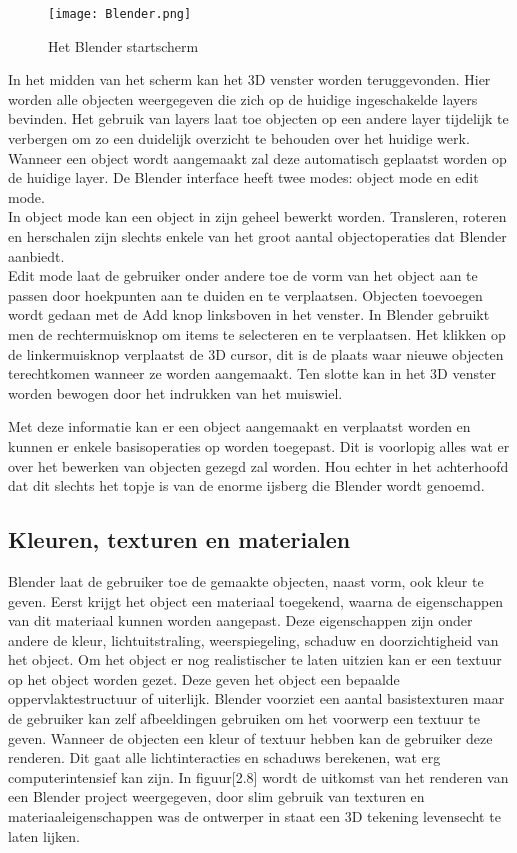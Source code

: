 \begin{figure}[h]
\texttt{[image: Blender.png]}
\caption{Het Blender startscherm}
\end{figure}

\par
In het midden van het scherm kan het 3D venster worden teruggevonden. Hier worden alle objecten weergegeven die zich op de huidige ingeschakelde layers bevinden. Het gebruik van layers laat toe objecten op een andere layer tijdelijk te verbergen om zo een duidelijk overzicht te behouden over het huidige werk. Wanneer een object wordt aangemaakt zal deze automatisch geplaatst worden op de huidige layer. De Blender interface heeft twee modes: object mode en edit mode.
\\
In object mode kan een object in zijn geheel bewerkt worden. Transleren, roteren en herschalen zijn slechts enkele van het groot aantal objectoperaties dat Blender aanbiedt. 
\\
Edit mode laat de gebruiker onder andere toe de vorm van het object aan te passen door hoekpunten aan te duiden en te verplaatsen. 
Objecten toevoegen wordt gedaan met de Add knop linksboven in het venster. 
In Blender gebruikt men de rechtermuisknop om items te selecteren en te verplaatsen. Het klikken op de linkermuisknop verplaatst de 3D cursor, dit is de plaats waar nieuwe objecten terechtkomen wanneer ze worden aangemaakt. Ten slotte kan in het 3D venster worden bewogen door het indrukken van het muiswiel.

\par
Met deze informatie kan er een object aangemaakt en verplaatst worden en kunnen er enkele basisoperaties op worden toegepast. Dit is voorlopig alles wat er over het bewerken van objecten gezegd zal worden. Hou echter in het achterhoofd dat dit slechts het topje is van de enorme ijsberg die Blender wordt genoemd.


\subsection{Kleuren, texturen en materialen}
Blender laat de gebruiker toe de gemaakte objecten, naast vorm, ook kleur te geven. Eerst krijgt het object een materiaal toegekend, waarna de eigenschappen van dit materiaal kunnen worden aangepast. Deze eigenschappen zijn onder andere de kleur, lichtuitstraling, weerspiegeling, schaduw en doorzichtigheid van het object. Om het object er nog realistischer te laten uitzien kan er een textuur op het object worden gezet. Deze geven het object een bepaalde oppervlaktestructuur of uiterlijk. Blender voorziet een aantal basistexturen maar de gebruiker kan zelf afbeeldingen gebruiken om het voorwerp een textuur te geven. Wanneer de objecten een kleur of textuur hebben kan de gebruiker deze renderen. Dit gaat alle lichtinteracties en schaduws berekenen, wat erg computerintensief kan zijn. In figuur[2.8] wordt de uitkomst van het renderen van een Blender project weergegeven, door slim gebruik van texturen en materiaaleigenschappen was de ontwerper in staat een 3D tekening levensecht te laten lijken. \citep*{BLEN2}

